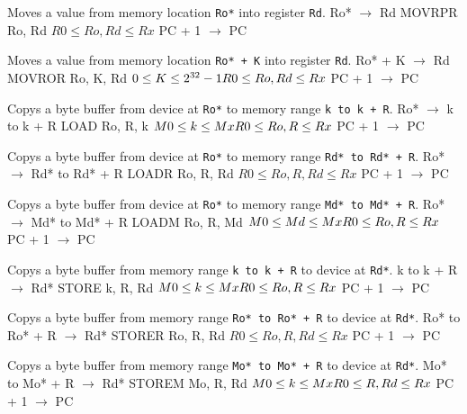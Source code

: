 \documentclass[titlepage]{scrartcl}
\begin{document}
{Moves a value from memory location \texttt{Ro*} into register \texttt{Rd}.}
{Ro* $\rightarrow$ Rd}
{MOVRPR Ro, Rd}
{$R0 \leq Ro, Rd \leq Rx$}
{PC + 1 $\rightarrow$ PC}
{}
{\srtable{}{}{}{}}

{Moves a value from memory location \texttt{Ro* + K} into register \texttt{Rd}.}
{Ro* + K $\rightarrow$ Rd}
{MOVROR Ro, K, Rd}
{$0 \leq K \leq 2^{32} - 1 \hfill \break R0 \leq Ro, Rd \leq Rx$}
{PC + 1 $\rightarrow$ PC}
{}
{\srtable{}{}{}{}}

{Copys a byte buffer from device at \texttt{Ro*} to memory range \texttt{k to k + R}.}
{Ro* $\rightarrow$ k to k + R}
{LOAD Ro, R, k}
{$M0 \leq k \leq Mx \hfill \break R0 \leq Ro, R \leq Rx$}
{PC + 1 $\rightarrow$ PC}
{}
{\srtable{}{}{}{}}

{Copys a byte buffer from device at \texttt{Ro*} to memory range \texttt{Rd* to Rd* + R}.}
{Ro* $\rightarrow$ Rd* to Rd* + R}
{LOADR Ro, R, Rd}
{$R0 \leq Ro, R, Rd \leq Rx$}
{PC + 1 $\rightarrow$ PC}
{}
{\srtable{}{}{}{}}

{Copys a byte buffer from device at \texttt{Ro*} to memory range \texttt{Md* to Md* + R}.}
{Ro* $\rightarrow$ Md* to Md* + R}
{LOADM Ro, R, Md}
{$M0 \leq Md \leq Mx \hfill \break R0 \leq Ro, R \leq Rx$}
{PC + 1 $\rightarrow$ PC}
{}
{\srtable{}{}{}{}}

{Copys a byte buffer from memory range \texttt{k to k + R} to device at \texttt{Rd*}.}
{k to k + R $\rightarrow$ Rd*}
{STORE k, R, Rd}
{$M0 \leq k \leq Mx \hfill \break R0 \leq Ro, R \leq Rx$}
{PC + 1 $\rightarrow$ PC}
{}
{\srtable{}{}{}{}}

{Copys a byte buffer from memory range \texttt{Ro* to Ro* + R} to device at \texttt{Rd*}.}
{Ro* to Ro* + R $\rightarrow$ Rd*}
{STORER Ro, R, Rd}
{$R0 \leq Ro, R, Rd \leq Rx$}
{PC + 1 $\rightarrow$ PC}
{}
{\srtable{}{}{}{}}

{Copys a byte buffer from memory range \texttt{Mo* to Mo* + R} to device at \texttt{Rd*}.}
{Mo* to Mo* + R $\rightarrow$ Rd*}
{STOREM Mo, R, Rd}
{$M0 \leq k \leq Mx \hfill \break R0 \leq R, Rd \leq Rx$}
{PC + 1 $\rightarrow$ PC}
{}
{\srtable{}{}{}{}}
\end{document}
